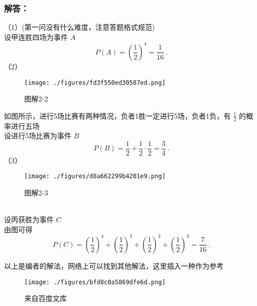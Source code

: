 \subsubsection{解答：}
（1）(第一问没有什么难度，注意答题格式规范)\\
设甲连胜四场为事件 $A$
\begin{equation}
P(A) = (\frac{1}{2})^4 = \frac{1}{16}~.
\end{equation}
（2）
\begin{figure}[ht]
\centering
\texttt{[image: ./figures/fd3f550ed30507ed.png]}
\caption{图解2-2} \label{fig_HsPbEc_1}
\end{figure}
如图所示，进行5场比赛有两种情况，负者1胜一定进行5场，负者1负，有 $\frac{1}{2}$ 的概率进行五场\\
设进行5场比赛为事件 $B$
\begin{equation}
P(B) = \frac{1}{2} + \frac{1}{2} \cdot \frac{1}{2} = \frac{3}{4}~.
\end{equation}
（3）
\begin{figure}[ht]
\centering
\texttt{[image: ./figures/d8a662299b4201e9.png]}
\caption{图解2-3} \label{fig_HsPbEc_2}
\end{figure}\\
设丙获胜为事件 $C$\\
由图可得
\begin{equation}
P(C) = (\frac{1}{2})^4 + (\frac{1}{2})^3 + (\frac{1}{2})^3 + (\frac{1}{2})^3 = \frac{7}{16}~.
\end{equation}

以上是编者的解法，网络上可以找到其他解法，这里插入一种作为参考
\begin{figure}[ht]
\centering
\texttt{[image: ./figures/bfd8c0a5869dfe6d.png]}
\caption{来自百度文库} \label{fig_HsPbEc_3}
\end{figure}
